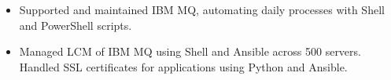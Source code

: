 \documentclass[10pt,a4paper,ragged2e,withhyper]{altacv}
\begin{document}
\begin{paracol}{2}
\divider

\begin{itemize}
\item Supported and maintained IBM MQ, automating daily processes with Shell and PowerShell scripts. 
\item Managed LCM of IBM MQ using Shell and Ansible across 500 servers. Handled SSL certificates for applications using Python and Ansible.
\end{itemize}

\medskip










\switchcolumn


\end{paracol}
\end{document}
